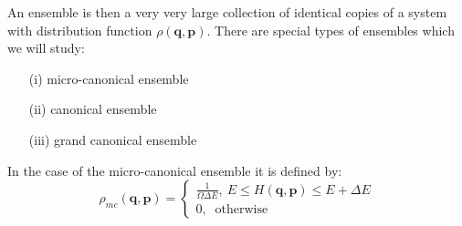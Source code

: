 \documentclass[a4paper,11pt,oneside]{book}
\begin{document}
An ensemble is then a very very large collection of identical copies of a system with distribution function $\rho(\textbf{q},\textbf{p})$. There are special types of ensembles which we will study:
\begin{enumerate}
    \item[(i)] micro-canonical ensemble
    \item[(ii)] canonical ensemble
    \item[(iii)] grand canonical ensemble
\end{enumerate}

In the case of the micro-canonical ensemble it is defined by:
\begin{equation}\label{microprob}
    \rho_{mc}(\textbf{q},\textbf{p})=\begin{cases}
    \frac{1}{\Omega \Delta E}, \ E\leq H(\textbf{q},\textbf{p}) \leq E+\Delta E \\
    0, \ \text{ otherwise}
    \end{cases}
\end{equation}
\end{document}
